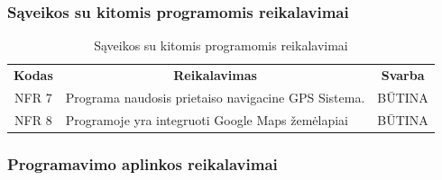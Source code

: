\documentclass{VUMIFPSkursinis}
\begin{document}
\subsubsection{Sąveikos su kitomis programomis reikalavimai}

\begin{center}
	\begin{table}[H]
	\caption{Sąveikos su kitomis programomis reikalavimai}
	\begin{tabular}{|p{2cm}|p{}|p{}|}
	\hline
	    \rowcolor{lightgray}
		\multicolumn{3}{|c|}{Sąveikos su kitomis programomis reikalavimai}\\
		
	\hline
		\multicolumn{1}{|c|}{{\bfseries Kodas}}&
		\multicolumn{1}{|c|}{{\bfseries Reikalavimas}}&
		\multicolumn{1}{|c|}{{\bfseries Svarba}}\\
	\hline 	
		\multicolumn{1}{|c|}{NFR 7}&
		{Programa naudosis prietaiso navigacine GPS Sistema.}&
		\multicolumn{1}{|c|}{BŪTINA}\\	
	
	\hline 	
		\multicolumn{1}{|c|}{NFR 8}&
		{Programoje yra integruoti Google Maps žemėlapiai}&
		\multicolumn{1}{|c|}{BŪTINA}\\	
	
	\hline 	 	 	
	\end{tabular}
	
	\label{table:Sąveikossukitomisprogramomisreikalavimai}
	\end{table}

\end{center}

\subsubsection{Programavimo aplinkos reikalavimai}
\end{document}

